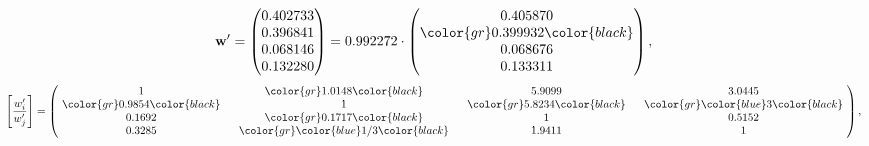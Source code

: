 \begin{example}
\begin{equation*}
\mathbf{w}^{\prime} =
\begin{pmatrix}
0.402733\\
0.396841\\
0.068146\\
0.132280
\end{pmatrix} =
0.992272\cdot
\begin{pmatrix}
0.405870\\
\color{gr} 0.399932\color{black} \\
0.068676\\
0.133311
\end{pmatrix},
\end{equation*}
\begin{equation*}
\left[ \frac{{w}^{\prime}_i}{{w}^{\prime}_j} \right] =
\begin{pmatrix}
$\,\,$ 1 $\,\,$ & $\,\,$\color{gr} 1.0148\color{black} $\,\,$ & $\,\,$5.9099$\,\,$ & $\,\,$3.0445$\,\,$ \\
$\,\,$\color{gr} 0.9854\color{black} $\,\,$ & $\,\,$ 1 $\,\,$ & $\,\,$\color{gr} 5.8234\color{black} $\,\,$ & $\,\,$\color{gr} \color{blue} 3\color{black}   $\,\,$ \\
$\,\,$0.1692$\,\,$ & $\,\,$\color{gr} 0.1717\color{black} $\,\,$ & $\,\,$ 1 $\,\,$ & $\,\,$0.5152 $\,\,$ \\
$\,\,$0.3285$\,\,$ & $\,\,$\color{gr} \color{blue}  1/3\color{black} $\,\,$ & $\,\,$1.9411$\,\,$ & $\,\,$ 1  $\,\,$ \\
\end{pmatrix},
\end{equation*}
\end{example}
\newpage

